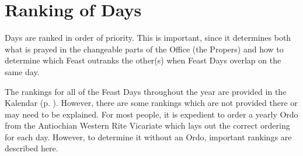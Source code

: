\section*{Ranking of Days}\label{ranking}
\noindent
{} Days are ranked in order of priority. This is important, since it determines both what is prayed in the changeable parts of the Office (the Propers) and how to determine which Feast outranks the other(s) when Feast Days overlap on the same day.\par
The rankings for all of the Feast Days throughout the year are provided in the Kalendar (p. \pageref{kalendar}). However, there are some rankings which are not provided there or may need to be explained. For most people, it is expedient to order a yearly Ordo from the Antiochian Western Rite Vicariate which lays out the correct ordering for each day. However, to determine it without an Ordo, important rankings are described here.

